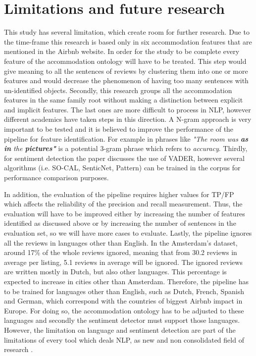 \section{Limitations and future research}
This study has several limitation, which create room for further research. Due to the time-frame this research is based only in six accommodation features that are mentioned in the Airbnb website. In order for the study to be complete every feature of the accommodation ontology will have to be treated. This step would give meaning to all the sentences of reviews by clustering them into one or more features and would decrease the phenomenon of having too many sentences with un-identified objects. Secondly, this research groups all the accommodation features in the same family root without making a distinction between explicit and implicit features. The last ones are more difficult to process in NLP, however different academics have taken steps in this direction. A N-gram approach is very important to be tested and it is believed to improve the performance of the pipeline for feature identification. For example in phrases like \textit{"The room was \textbf{as in} the \textbf{pictures"}} is a potential 3-gram phrase which refers to \textit{accuracy}. Thirdly, for sentiment detection the paper discusses the use of VADER, however several algorithms (i.e. SO-CAL, SenticNet, Pattern)  can be trained in the corpus for performance comparison purposes. 


In addition, the evaluation of the pipeline requires higher values for TP/FP which affects the reliability of the precision and recall measurement. Thus, the evaluation will have to be improved either by increasing the number of features identified as discussed above or by increasing the number of sentences in the evaluation set, so we will have more cases to evaluate. Lastly, the pipeline ignores all the reviews in languages other than English. In the Amsterdam's dataset, around 17\% of the whole reviews ignored, meaning that from 30.2 reviews in average per listing, 5.1 reviews in average will be ignored. The ignored reviews are written mostly in Dutch, but also other languages. This percentage is expected to increase in cities other than Amsterdam. Therefore, the pipeline has to be trained for languages other than English, such as Dutch, French, Spanish and German, which correspond with the countries of biggest Airbnb impact in Europe. For doing so, the accommodation ontology has to be adjusted to these languages and secondly the sentiment detector must support those languages. However, the limitation on language and sentiment detection are part of the limitations of every tool which deals NLP, as new and non consolidated field of research \cite{ravi2015survey}.


